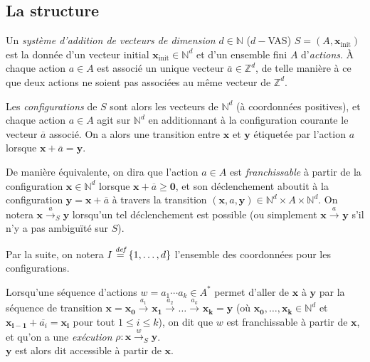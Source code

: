 \documentclass[a4paper,final]{article}
\theoremstyle{definition}
\let\leq\leqslant
\let\geq\geqslant
\newcommand{\os}[1]{\left\{\mathinner{#1}\right\}}
\newcommand{\defeq}{\ensuremath{\stackrel{\textit{def}}{=}}}
\newcommand{\N}{\ensuremath{\mathbb{N}}}
\newcommand{\Z}{\ensuremath{\mathbb{Z}}}
\newcommand{\trans}[2]{\ensuremath{\stackrel{#1}{\longrightarrow}_{#2}}}
\newcommand{\vect}[1]{\ensuremath{\mathbf{#1}}}
\newcommand{\xinit}{\ensuremath{\vect{x}_\text{init}}}
\newcommand{\valeur}[1]{\ensuremath{\overline{#1}}}
\begin{document}
\subsection{La structure}

Un \emph{système d'addition de vecteurs de dimension} $d\in\N$ ($d-$VAS) $S=(A,\xinit)$ est la donnée d'un vecteur initial $\xinit\in\N^d$ et d'un ensemble fini $A$ d'\emph{actions}.
À chaque action $a\in A$ est associé un unique vecteur $\valeur{a}\in \Z^d$, de telle manière à ce que deux actions ne soient pas associées au même vecteur de $\Z^d$.
\vspace{3mm}

Les \emph{configurations} de $S$ sont alors les vecteurs de $\N^d$ (à coordonnées positives), 
et chaque action $a\in A$ agit sur $\N^d$ en additionnant à la configuration courante le vecteur $\valeur{a}$ associé.
On a alors une transition entre $\vect{x}$ et $\vect{y}$ étiquetée par l'action $a$ lorsque $\vect{x} + \valeur{a} = \vect{y}$.

De manière équivalente, on dira que l'action $a\in A$ est \emph{franchissable} 
à partir de la configuration $\vect{x}\in \N^d$ lorsque $\vect{x} + \valeur{a} \geq \vect{0}$,
et son déclenchement aboutit à la configuration $\vect{y} = \vect{x} + \valeur{a}$ à travers la transition $(\vect{x},a,\vect{y})\in \N^d\times A\times \N^d$.
On notera $\vect{x}\trans{a}{S} \vect{y}$ lorsqu'un tel déclenchement est possible (ou simplement $\vect{x}\trans{a}{} \vect{y}$ s'il n'y a pas ambiguïté sur $S$).

\begin{center}
Par la suite, on notera $I \defeq \os{1,\dots,d}$ l'ensemble des coordonnées pour les configurations.
\end{center}


Lorsqu'une séquence d'actions $w= a_1\cdots a_k\in A^\ast$ permet d'aller de $\vect{x}$ à $\vect{y}$ par la séquence de transition $\vect{x}= \vect{x_0}\trans{a_1}{} \vect{x_1}\trans{a_2}{} \dots\trans{a_k}{} \vect{x_k}=\vect{y}$
(où $\vect{x_0},\dots,\vect{x_k} \in\N^d$ et $\vect{x_{i-1}} +\valeur{a_i} =\vect{x_i}$ pour tout $1\leq i\leq k$),
on dit que $w$ est franchissable à partir de $\vect{x}$, et qu'on a une \emph{exécution} $\rho :\vect{x}\trans{w}{S} \vect{y}$.\\
$\vect{y}$ est alors dit accessible à partir de $\vect{x}$.
\end{document}

